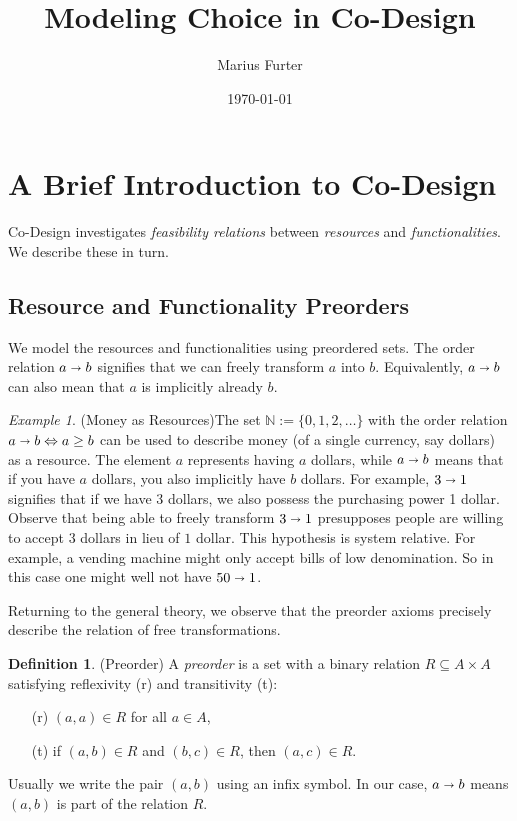 \documentclass[12pt]{article}
\title{Modeling Choice in Co-Design}
\author{Marius Furter}
\date{\today}
\theoremstyle{definition}
\newtheorem{definition}{Definition}[section]
\theoremstyle{plain}
\theoremstyle{plain}
\theoremstyle{plain}
\theoremstyle{plain}
\theoremstyle{remark}
\newtheorem{example}{Example}[section]
\theoremstyle{remark}
\newcommand{\sub}{\subseteq}
\begin{document}
\maketitle
\tableofcontents

\section{A Brief Introduction to Co-Design}

Co-Design investigates \emph{feasibility relations} between \emph{resources} and \emph{functionalities}. We describe these in turn.

\subsection{Resource and Functionality Preorders}

We model the resources and functionalities using preordered sets. The order relation $a \shortrightarrow b$ signifies that we can freely transform $a$ into $b$. Equivalently, $a \shortrightarrow b$ can also mean that $a$ is implicitly already $b$.

\begin{example}(Money as Resources)\label{ex:money}
	The set $\mathbb{N} := \{0,1,2,\ldots \}$ with the order relation $a \shortrightarrow b \Leftrightarrow a \geq b$ can be used to describe money (of a single currency, say dollars) as a resource. The element $a$ represents having $a$ dollars, while $a \shortrightarrow b$ means that if you have $a$ dollars, you also implicitly have $b$ dollars. For example, $3 \shortrightarrow 1$ signifies that if we have 3 dollars, we also possess the purchasing power 1 dollar. Observe that being able to freely transform $3 \shortrightarrow 1$ presupposes people are willing to accept $3$ dollars in lieu of $1$ dollar. This hypothesis is system relative. For example, a vending machine might only accept bills of low denomination. So in this case one might well not have $50 \shortrightarrow 1$.
\end{example}

Returning to the general theory, we observe that the preorder axioms precisely describe the relation of free transformations.

\begin{definition}(Preorder)
	A \emph{preorder} is a set with a binary relation $R \sub A \times A$ satisfying reflexivity (r) and transitivity (t):
	\begin{itemize}
		\item[(r)] $(a,a) \in R$ for all $a \in A$,
		\item[(t)] if $(a,b) \in R$ and $(b,c) \in R$, then $(a,c) \in R$.
	\end{itemize}
	Usually we write the pair $(a,b)$ using an infix symbol. In our case, $a \shortrightarrow b$ means $(a,b)$ is part of the relation $R$.
\end{definition}
\end{document}
